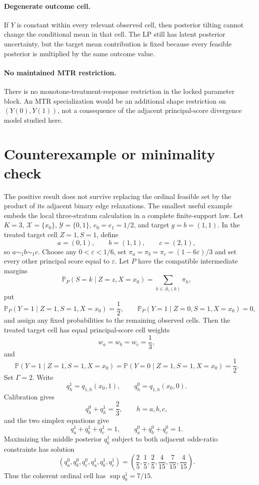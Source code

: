 \documentclass[11pt]{article}
\renewcommand{\Pr}{\mathbb{P}}
\theoremstyle{definition}
\theoremstyle{plain}
\theoremstyle{remark}
\begin{document}
\paragraph{Degenerate outcome cell.}
If \(Y\) is constant within every relevant observed cell, then posterior tilting
cannot change the conditional mean in that cell.  The LP still has latent
posterior uncertainty, but the target mean contribution is fixed because every
feasible posterior is multiplied by the same outcome value.

\paragraph{No maintained MTR restriction.}
There is no monotone-treatment-response restriction in the locked parameter
block.  An MTR specialization would be an additional shape restriction on
\((Y(0),Y(1))\), not a consequence of the adjacent principal-score divergence
model studied here.

\section{Counterexample or minimality check}
\label{sec:counterexample-minimality}
The positive result does not survive replacing the ordinal feasible set by the
product of its adjacent binary edge relaxations.  The smallest useful example
embeds the local three-stratum calculation in a complete finite-support law.
Let \(K=3\), \(\mathcal X=\{x_0\}\), \(\mathcal Y=\{0,1\}\), \(e_0=e_1=1/2\),
and target \(g=b=(1,1)\).  In the treated target cell \(Z=1,S=1\), define
\[
  a=(0,1),\qquad b=(1,1),\qquad c=(2,1),
\]
so \(a\sim_1 b\sim_1 c\).  Choose any \(0<\varepsilon<1/6\), set
\(\pi_a=\pi_b=\pi_c=(1-6\varepsilon)/3\) and set every other principal score
equal to \(\varepsilon\).  Let \(P\) have the compatible intermediate margins
\[
  \Pr_P(S=k\mid Z=z,X=x_0)=\sum_{h\in A_z(k)}\pi_h,
\]
put
\[
  \Pr_P(Y=1\mid Z=1,S=1,X=x_0)=\frac12,
  \qquad
  \Pr_P(Y=1\mid Z=0,S=1,X=x_0)=0,
\]
and assign any fixed probabilities to the remaining observed cells.  Then the
treated target cell has equal principal-score cell weights
\[
  w_a=w_b=w_c=\frac13,
\]
and
\[
  \Pr(Y=1\mid Z=1,S=1,X=x_0)
  =
  \Pr(Y=0\mid Z=1,S=1,X=x_0)
  =
  \frac12.
\]
Set \(\Gamma=2\).  Write
\[
  q_h^1=q_{1,h}(x_0,1),\qquad q_h^0=q_{1,h}(x_0,0).
\]
Calibration gives
\[
  q_h^0+q_h^1=\frac23,\qquad h=a,b,c,
\]
and the two simplex equations give
\[
  q_a^1+q_b^1+q_c^1=1,\qquad
  q_a^0+q_b^0+q_c^0=1.
\]
Maximizing the middle posterior \(q_b^1\) subject to both adjacent odds-ratio
constraints has solution
\[
  (q_a^0,q_b^0,q_c^0,q_a^1,q_b^1,q_c^1)
  =
  \left(\frac25,\frac15,\frac25,\frac4{15},\frac7{15},\frac4{15}\right).
\]
Thus the coherent ordinal cell has \(\sup q_b^1=7/15\).
\end{document}
